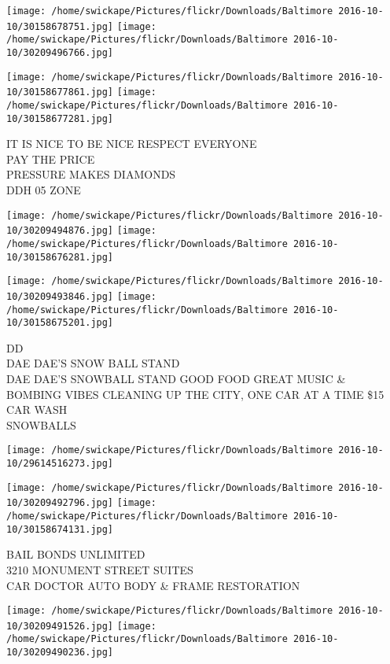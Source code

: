 \documentclass[10pt,letterpaper]{article}
\begin{document}
\texttt{[image: /home/swickape/Pictures/flickr/Downloads/Baltimore 2016-10-10/30158678751.jpg]}
\texttt{[image: /home/swickape/Pictures/flickr/Downloads/Baltimore 2016-10-10/30209496766.jpg]}

\texttt{[image: /home/swickape/Pictures/flickr/Downloads/Baltimore 2016-10-10/30158677861.jpg]}
\texttt{[image: /home/swickape/Pictures/flickr/Downloads/Baltimore 2016-10-10/30158677281.jpg]}

IT IS NICE TO BE NICE RESPECT EVERYONE\\
PAY THE PRICE\\
PRESSURE MAKES DIAMONDS\\
DDH 05 ZONE\\
\pagebreak

\texttt{[image: /home/swickape/Pictures/flickr/Downloads/Baltimore 2016-10-10/30209494876.jpg]}
\texttt{[image: /home/swickape/Pictures/flickr/Downloads/Baltimore 2016-10-10/30158676281.jpg]}

\texttt{[image: /home/swickape/Pictures/flickr/Downloads/Baltimore 2016-10-10/30209493846.jpg]}
\texttt{[image: /home/swickape/Pictures/flickr/Downloads/Baltimore 2016-10-10/30158675201.jpg]}

DD\\
DAE DAE'S SNOW BALL STAND\\
DAE DAE'S SNOWBALL STAND GOOD FOOD GREAT MUSIC \& BOMBING VIBES CLEANING UP THE CITY, ONE CAR AT A TIME \$15 CAR WASH\\
SNOWBALLS\\
\pagebreak

\texttt{[image: /home/swickape/Pictures/flickr/Downloads/Baltimore 2016-10-10/29614516273.jpg]}

\vspace{0.25in}
\texttt{[image: /home/swickape/Pictures/flickr/Downloads/Baltimore 2016-10-10/30209492796.jpg]}
\texttt{[image: /home/swickape/Pictures/flickr/Downloads/Baltimore 2016-10-10/30158674131.jpg]}

BAIL BONDS UNLIMITED\\
3210 MONUMENT STREET SUITES\\
CAR DOCTOR AUTO BODY \& FRAME RESTORATION\\
\pagebreak

\texttt{[image: /home/swickape/Pictures/flickr/Downloads/Baltimore 2016-10-10/30209491526.jpg]}
\texttt{[image: /home/swickape/Pictures/flickr/Downloads/Baltimore 2016-10-10/30209490236.jpg]}
\end{document}
